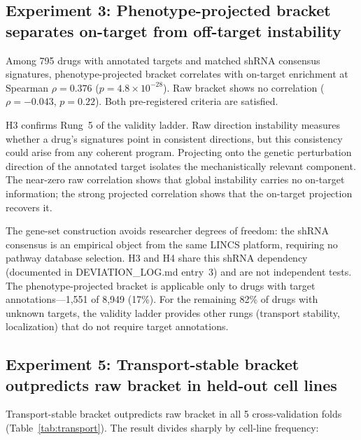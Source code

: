 \documentclass{article}
\begin{document}
\subsection{Experiment 3: Phenotype-projected bracket separates on-target from off-target instability}

Among 795 drugs with annotated targets and matched shRNA consensus signatures,
phenotype-projected bracket correlates with on-target enrichment at Spearman
$\rho = 0.376$ ($p = 4.8 \times 10^{-28}$). Raw bracket shows no correlation
($\rho = -0.043$, $p = 0.22$). Both pre-registered criteria are satisfied.

H3 confirms Rung~5 of the validity ladder. Raw direction instability
measures whether a drug's signatures point in consistent directions, but
this consistency could arise from any coherent program. Projecting onto the
genetic perturbation direction of the annotated target isolates the
mechanistically relevant component. The near-zero raw correlation shows
that global instability carries no on-target information; the strong
projected correlation shows that the on-target projection recovers it.

The gene-set construction avoids researcher degrees of freedom: the shRNA
consensus is an empirical object from the same LINCS platform,
requiring no pathway database selection. H3 and H4 share this shRNA
dependency (documented in DEVIATION\_LOG.md entry~3) and are not
independent tests. The phenotype-projected bracket is applicable only
to drugs with target annotations---1{,}551 of 8{,}949 (17\%). For the
remaining 82\% of drugs with unknown targets, the validity ladder
provides other rungs (transport stability, localization) that do not
require target annotations.

\subsection{Experiment 5: Transport-stable bracket outpredicts raw bracket in held-out cell lines}

Transport-stable bracket outpredicts raw bracket in all 5 cross-validation
folds (Table~\ref{tab:transport}). The result divides sharply by cell-line
frequency:
\end{document}

